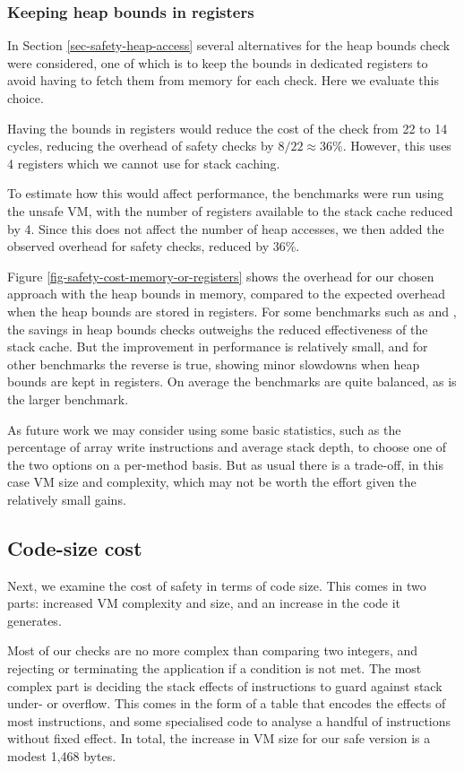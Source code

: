 \subsubsection{Keeping heap bounds in registers}
In Section \ref{sec-safety-heap-access} several alternatives for the heap bounds check were considered, one of which is to keep the bounds in dedicated registers to avoid having to fetch them from memory for each check. Here we evaluate this choice.

Having the bounds in registers would reduce the cost of the check from 22 to 14 cycles, reducing the overhead of safety checks by $8/22 \approx 36\%$. However, this uses 4 registers which we cannot use for stack caching.

To estimate how this would affect performance, the benchmarks were run using the unsafe VM, with the number of registers available to the stack cache reduced by 4. Since this does not affect the number of heap accesses, we then added the observed overhead for safety checks, reduced by 36\%.

Figure \ref{fig-safety-cost-memory-or-registers} shows the overhead for our chosen approach with the heap bounds in memory, compared to the expected overhead when the heap bounds are stored in registers. For some benchmarks such as  and , the savings in heap bounds checks outweighs the reduced effectiveness of the stack cache. But the improvement in performance is relatively small, and for other benchmarks the reverse is true, showing minor slowdowns when heap bounds are kept in registers. On average the benchmarks are quite balanced, as is the larger  benchmark.

As future work we may consider using some basic statistics, such as the percentage of array write instructions and average stack depth, to choose one of the two options on a per-method basis. But as usual there is a trade-off, in this case VM size and complexity, which may not be worth the effort given the relatively small gains.

\subsection{Code-size cost}
Next, we examine the cost of safety in terms of code size. This comes in two parts: increased VM complexity and size, and an increase in the code it generates.

Most of our checks are no more complex than comparing two integers, and rejecting or terminating the application if a condition is not met. The most complex part is deciding the stack effects of instructions to guard against stack under- or overflow. This comes in the form of a table that encodes the effects of most instructions, and some specialised code to analyse a handful of instructions without fixed effect. In total, the increase in VM size for our safe version is a modest 1,468 bytes.

